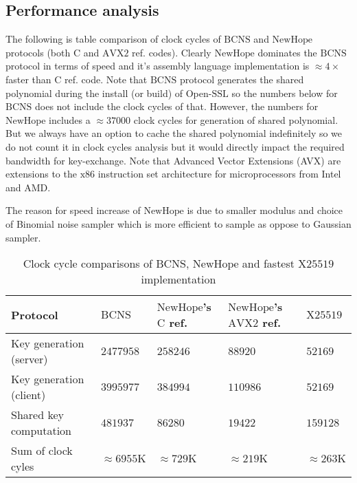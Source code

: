 \subsection{Performance analysis}
The following is table comparison of clock cycles of $\mathrm{BCNS}$ and $\mathrm{NewHope}$ protocols (both $\mathrm{C}$ and $\mathrm{AVX2}$ ref. codes). Clearly $\mathrm{NewHope}$ dominates the $\mathrm{BCNS}$ protocol in terms of speed and it's assembly language implementation is $\approx 4 \times$ faster than $\mathrm{C}$ ref. code. Note that $\mathrm{BCNS}$ protocol generates the shared polynomial during the install (or build) of Open-$\mathrm{SSL}$ so the numbers below for $\mathrm{BCNS}$ does not include the clock cycles of that. However, the numbers for $\mathrm{NewHope}$ includes a $\approx 37000$ clock cycles for generation of shared polynomial. But we always have an option to cache the shared polynomial indefinitely so we do not count it in clock cycles analysis but it would directly impact the required bandwidth for key-exchange. Note that Advanced Vector Extensions (AVX) are extensions to the $\mathrm{x86}$ instruction set architecture for microprocessors from Intel and AMD.

The reason for speed increase of $\mathrm{NewHope}$ is due to smaller modulus and choice of Binomial noise sampler which is more efficient to sample as oppose to Gaussian sampler. 

\begin{table}[H]
\centering
\begin{tabular}{|l|l|l|l|l|}
\hline
Protocol                    & $\mathrm{BCNS}$ & $\mathrm{NewHope}$'s $\mathrm{C}$ ref.   & $\mathrm{NewHope}$'s $\mathrm{AVX2}$ ref.  & $\mathrm{X25519}$          \\ \hline
Key generation (server)     & $ 2477958$         & $ 258246$                                             & $ 88920$        & $ 52169$  \\ \hline
Key generation (client)     & $ 3995977$         & $ 384994$                                             & $ 110986$       & $ 52169$  \\ \hline
Shared key computation      & $ 481937 $         & $ 86280 $                                             & $ 19422$        & $ 159128$ \\ \hline
Sum of clock cyles          & $ \approx6955\text{K}$    & $ \approx729\text{K}$                          & $ \approx219\text{K}$  & $ \approx263\text{K}$ \\ \hline
\end{tabular}
\caption{Clock cycle comparisons of $\mathrm{BCNS}$, $\mathrm{NewHope}$ and fastest $\mathrm{X25519}$ implementation}
\end{table}


